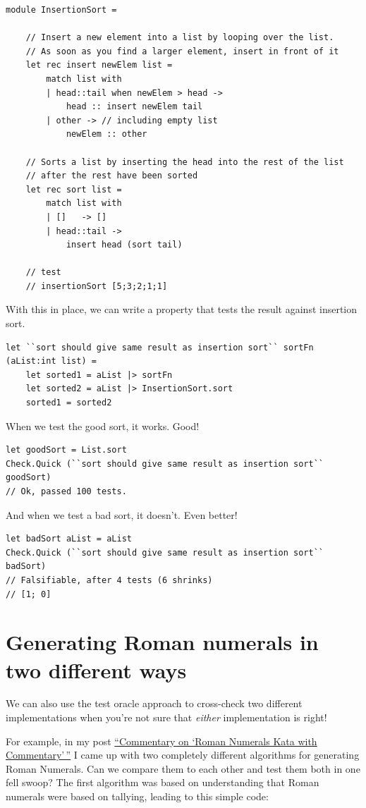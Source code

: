 \begin{verbatim}
module InsertionSort = 
	
	// Insert a new element into a list by looping over the list.
	// As soon as you find a larger element, insert in front of it
	let rec insert newElem list = 
		match list with 
		| head::tail when newElem > head -> 
			head :: insert newElem tail
		| other -> // including empty list
			newElem :: other 

	// Sorts a list by inserting the head into the rest of the list 
	// after the rest have been sorted
	let rec sort list = 
		match list with
		| []   -> []
		| head::tail -> 
			insert head (sort tail)

	// test
	// insertionSort [5;3;2;1;1]
\end{verbatim}
With this in place, we can write a property that tests the result
against insertion sort.

\begin{verbatim}
let ``sort should give same result as insertion sort`` sortFn (aList:int list) = 
	let sorted1 = aList |> sortFn 
	let sorted2 = aList |> InsertionSort.sort
	sorted1 = sorted2 
\end{verbatim}
When we test the good sort, it works. Good!

\begin{verbatim}
let goodSort = List.sort
Check.Quick (``sort should give same result as insertion sort`` goodSort)
// Ok, passed 100 tests.
\end{verbatim}
And when we test a bad sort, it doesn't. Even better!

\begin{verbatim}
let badSort aList = aList 
Check.Quick (``sort should give same result as insertion sort`` badSort)
// Falsifiable, after 4 tests (6 shrinks) 
// [1; 0]
\end{verbatim}


\section{Generating Roman numerals in two different
ways}
\label{generating-roman-numerals-in-two-different-ways}

We can also use the test oracle approach to cross-check two different
implementations when you're not sure that \emph{either} implementation
is right!

For example, in my post \href{/posts/roman-numeral-kata/}{``Commentary
on `Roman Numerals Kata with Commentary'\,''} I came up with two
completely different algorithms for generating Roman Numerals. Can we
compare them to each other and test them both in one fell swoop?
The first algorithm was based on understanding that Roman numerals were
based on tallying, leading to this simple code:


